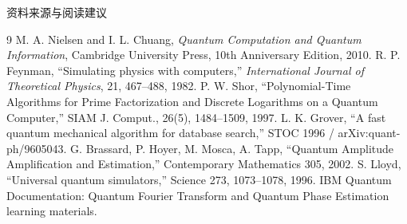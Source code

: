 \documentclass[aspectratio=169,10pt]{ctexbeamer}
\begin{document}
\begin{frame}{资料来源与阅读建议}
\footnotesize
\begin{thebibliography}{9}
 M. A. Nielsen and I. L. Chuang, \emph{Quantum Computation and Quantum Information}, Cambridge University Press, 10th Anniversary Edition, 2010.
 R. P. Feynman, ``Simulating physics with computers,'' \emph{International Journal of Theoretical Physics}, 21, 467--488, 1982.
 P. W. Shor, ``Polynomial-Time Algorithms for Prime Factorization and Discrete Logarithms on a Quantum Computer,'' SIAM J. Comput., 26(5), 1484--1509, 1997.
 L. K. Grover, ``A fast quantum mechanical algorithm for database search,'' STOC 1996 / arXiv:quant-ph/9605043.
 G. Brassard, P. Hoyer, M. Mosca, A. Tapp, ``Quantum Amplitude Amplification and Estimation,'' Contemporary Mathematics 305, 2002.
 S. Lloyd, ``Universal quantum simulators,'' Science 273, 1073--1078, 1996.
 IBM Quantum Documentation: Quantum Fourier Transform and Quantum Phase Estimation learning materials.
\end{thebibliography}
\end{frame}
\end{document}
